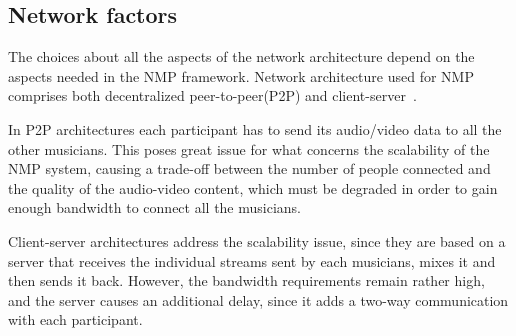 
\subsection{Network factors}\label{subsec:network}
The choices about all the aspects of the network architecture depend on the aspects needed in the NMP framework. 
Network architecture used for NMP comprises both decentralized peer-to-peer(P2P) and client-server~\cite{RottondiOverview}. 

In P2P architectures each participant has to send its audio/video data to all the other musicians. This poses great issue for what concerns the scalability of the NMP system, causing a trade-off between the number of people connected and the quality of the audio-video content, which must be degraded in order to gain enough bandwidth to connect all the musicians.

Client-server architectures address the scalability issue, since they are based on a server that receives the individual streams sent by each musicians, mixes it and then sends it back. However, the bandwidth requirements remain rather high, and the server causes an additional delay, since it adds a two-way communication with each participant.


